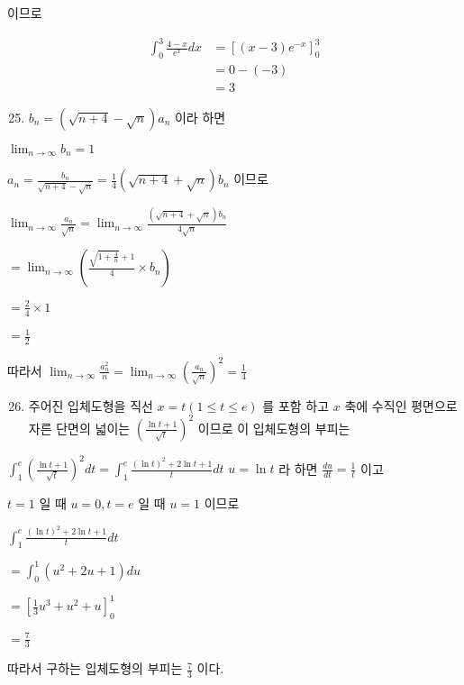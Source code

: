 \documentclass[10pt]{article}
\begin{document}
이므로

\[
\begin{aligned}
\int_{0}^{3} \frac{4-x}{e^{x}} d x & =\left[(x-3) e^{-x}\right]_{0}^{3} \\
& =0-(-3) \\
& =3
\end{aligned}
\]

\begin{enumerate}
  \setcounter{enumi}{24}
  \item \(b_{n}=(\sqrt{n+4}-\sqrt{n}) a_{n}\) 이라 하면
\end{enumerate}

\(\lim _{n \rightarrow \infty} b_{n}=1\)

\(a_{n}=\frac{b_{n}}{\sqrt{n+4}-\sqrt{n}}=\frac{1}{4}(\sqrt{n+4}+\sqrt{n}) b_{n}\) 이므로

\(\lim _{n \rightarrow \infty} \frac{a_{n}}{\sqrt{n}}=\lim _{n \rightarrow \infty} \frac{(\sqrt{n+4}+\sqrt{n}) b_{n}}{4 \sqrt{n}}\)

\(=\lim _{n \rightarrow \infty}\left(\frac{\sqrt{1+\frac{4}{n}}+1}{4} \times b_{n}\right)\)

\(=\frac{2}{4} \times 1\)

\(=\frac{1}{2}\)

따라서 \(\lim _{n \rightarrow \infty} \frac{a_{n}^{2}}{\dot{n}}=\lim _{n \rightarrow \infty}\left(\frac{a_{n}}{\sqrt{n}}\right)^{2}=\frac{1}{4}\)

\begin{enumerate}
  \setcounter{enumi}{25}
  \item 주어진 입체도형을 직선 \(x=t(1 \leq t \leq e)\) 를 포함 하고 \(x\) 축에 수직인 평면으로 자른 단면의 넓이는 \(\left(\frac{\ln t+1}{\sqrt{t}}\right)^{2}\) 이므로 이 입체도형의 부피는
\end{enumerate}

\(\int_{1}^{e}\left(\frac{\ln t+1}{\sqrt{t}}\right)^{2} d t=\int_{1}^{e} \frac{(\ln t)^{2}+2 \ln t+1}{t} d t\) \(u=\ln t\) 라 하면 \(\frac{d u}{d t}=\frac{1}{t}\) 이고

\(t=1\) 일 때 \(u=0, t=e\) 일 때 \(u=1\) 이므로

\(\int_{1}^{e} \frac{(\ln t)^{2}+2 \ln t+1}{t} d t\)

\(=\int_{0}^{1}\left(u^{2}+2 u+1\right) d u\)

\(=\left[\frac{1}{3} u^{3}+u^{2}+u\right]_{0}^{1}\)

\(=\frac{7}{3}\)

따라서 구하는 입체도형의 부피는 \(\frac{7}{3}\) 이다.
\end{document}
